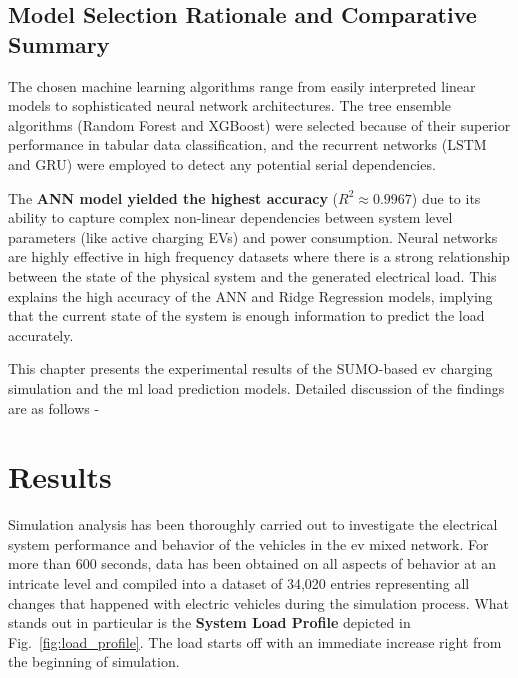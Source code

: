 \documentclass{thesis-library}
\begin{document}
{\subsection{Model Selection Rationale and Comparative Summary}

The chosen machine learning algorithms range from easily interpreted linear models to sophisticated neural network architectures. The tree ensemble algorithms (Random Forest and XGBoost) were selected because of their superior performance in tabular data classification, and the recurrent networks (LSTM and GRU) were employed to detect any potential serial dependencies.

The \textbf{ANN model yielded the highest accuracy} ($R^2 \approx 0.9967$) due to its ability to capture complex non-linear dependencies between system level parameters (like active charging EVs) and power consumption. Neural networks are highly effective in high frequency datasets where there is a strong relationship between the state of the physical system and the generated electrical load. This explains the high accuracy of the ANN and Ridge Regression models, implying that the current state of the system is enough information to predict the load accurately.


This chapter presents the experimental results of the SUMO-based \Gls{ev} charging
simulation and the \Gls{ml} load prediction models. Detailed discussion of
the findings are as follows -

\section{Results}

Simulation analysis has been thoroughly carried out to investigate the electrical system performance and behavior of the vehicles in the \gls{ev} mixed network. For more than 600 seconds, data has been obtained on all aspects of behavior at an intricate level and compiled into a dataset of 34,020 entries representing all changes that happened with electric vehicles during the simulation process. What stands out in particular is the \textbf{System Load Profile} depicted in Fig.~\ref{fig:load_profile}. The load starts off with an immediate increase right from the beginning of simulation.

}
\end{document}
